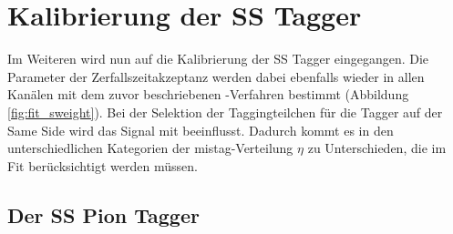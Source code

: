 \section{Kalibrierung der SS Tagger}

Im Weiteren wird nun auf die Kalibrierung der SS Tagger eingegangen. Die Parameter der Zerfallszeitakzeptanz werden dabei ebenfalls wieder in allen Kanälen mit dem zuvor beschriebenen \sPlot-Verfahren \cite{splot} bestimmt (Abbildung \ref{fig:fit_sweight}). Bei der Selektion der Taggingteilchen für die Tagger auf der Same Side wird das Signal mit beeinflusst. Dadurch kommt es in den unterschiedlichen Kategorien der mistag-Verteilung $\eta$ zu Unterschieden, die im Fit berücksichtigt werden müssen.

\subsection{Der SS Pion Tagger}

